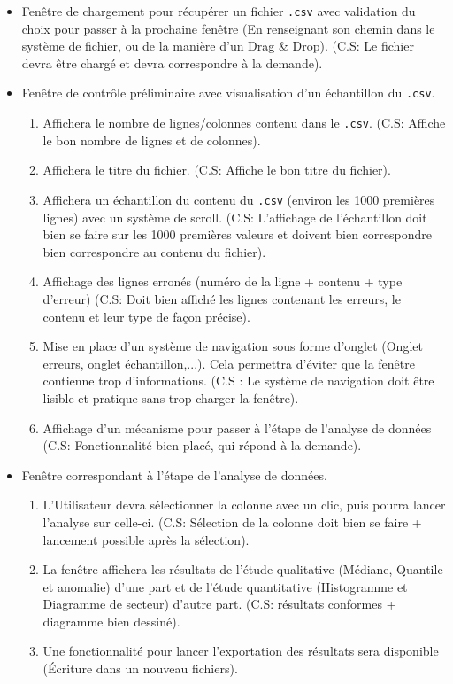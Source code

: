 \begin{itemize}
			\item Fenêtre de chargement pour récupérer un fichier \lstinline!.csv! avec validation du choix pour passer à la prochaine fenêtre (En renseignant son chemin dans le système de fichier, ou de la manière d'un Drag \& Drop). (C.S: Le fichier devra être chargé  et devra correspondre à la demande).
			\item Fenêtre de contrôle préliminaire avec visualisation d'un échantillon du \lstinline!.csv!.		
				\begin{enumerate}
				\item Affichera le nombre de lignes/colonnes contenu dans le \lstinline!.csv!. (C.S: Affiche le bon nombre de lignes et de colonnes).
				\item Affichera le titre du fichier. (C.S: Affiche le bon titre du fichier).
				\item Affichera un échantillon du contenu du \lstinline!.csv! (environ les 1000 premières lignes) avec un système de scroll. (C.S: L'affichage de l'échantillon doit bien se faire sur les 1000 premières valeurs et doivent bien correspondre bien correspondre au contenu du fichier). 
				\item Affichage des lignes erronés (numéro de la ligne + contenu + type d'erreur) (C.S: Doit bien affiché les lignes contenant les erreurs, le contenu et leur type de façon précise).
				\item Mise en place d'un système de navigation sous forme d'onglet (Onglet erreurs, onglet échantillon,...). Cela permettra d'éviter que la fenêtre contienne trop d'informations. (C.S : Le système de navigation doit être lisible et pratique sans trop charger la fenêtre).
				\item Affichage d'un mécanisme pour passer à l'étape de l'analyse de données (C.S: Fonctionnalité bien placé, qui répond à la demande).
				\end{enumerate}
			\item Fenêtre correspondant à l'étape de l'analyse de données.
				\begin{enumerate}
				\item L'Utilisateur devra sélectionner la colonne avec un clic, puis pourra lancer l'analyse sur celle-ci. (C.S: Sélection de la colonne doit bien se faire + lancement possible après la sélection).
				\item La fenêtre affichera les résultats de l'étude qualitative (Médiane, Quantile et anomalie) d'une part et de l'étude quantitative (Histogramme et Diagramme de secteur) d'autre part. (C.S: résultats conformes + diagramme bien dessiné). 
				\item Une fonctionnalité pour lancer l'exportation des résultats sera disponible (Écriture dans un nouveau fichiers).
				\end{enumerate}
			\end{itemize}
			
